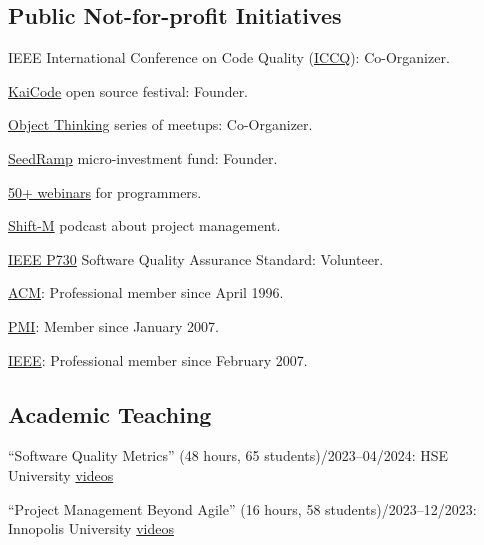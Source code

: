 \documentclass{vl}
\begin{document}
    \subsection*{Public Not-for-profit Initiatives}

    IEEE International Conference on Code Quality (\href{https://www.iccq.ru}{ICCQ}): Co-Organizer.

    \href{https://www.kaicode.org}{KaiCode} open source festival: Founder.

    \href{https://www.meetup.com/Object-Thinking/}{Object Thinking} series of meetups: Co-Organizer.


    \href{https:www.seedramp.com/}{SeedRamp} micro-investment fund: Founder.

    \href{https://www.yegor256.com/webinars.html}{50+ webinars} for programmers.

    \href{https://www.yegor256.com/shift-m.html}{Shift-M} podcast about project management.

    \href{http://ieeexplore.ieee.org/document/6835311/}{IEEE P730} Software Quality Assurance Standard: Volunteer.

    \href{https://www.acm.org}{ACM}: Professional member since April 1996.

    \href{https://certification.pmi.org/registry.aspx}{PMI}: Member since January 2007.

    \href{https://www.ieee.org}{IEEE}: Professional member since February 2007.

    \subsection*{Academic Teaching}

    ``Software Quality Metrics'' (48 hours, 65 students)/2023--04/2024: HSE University\newline
    \href{https://www.youtube.com/playlist?list=PLaIsQH4uc08xyXRhhYPHh-Yam2kEwNaLl}{videos}

    ``Project Management Beyond Agile'' (16 hours, 58 students)/2023--12/2023: Innopolis University\newline
    \href{https://www.youtube.com/playlist?list=PLaIsQH4uc08x_T-Aelduv3Zf0DWRx40pq}{videos}
\end{document}
